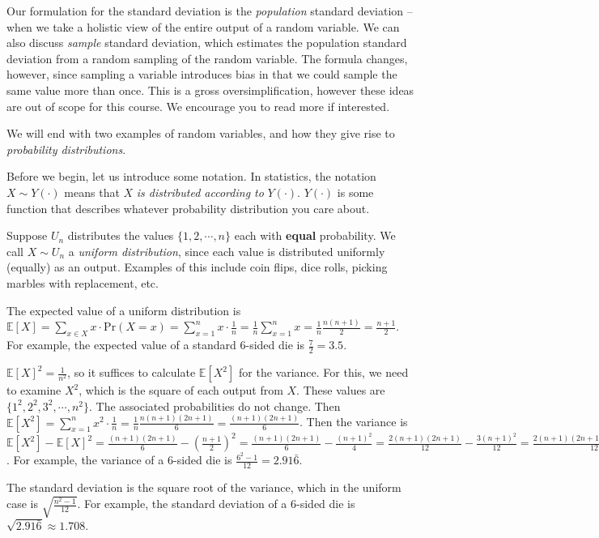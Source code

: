 \documentclass[main.tex]{subfiles}
\begin{document}
Our formulation for the standard deviation is the \textit{population} standard deviation -- when we take a holistic view of the entire output of a random variable. We can also discuss \textit{sample} standard deviation, which estimates the population standard deviation from a random sampling of the random variable. The formula changes, however, since sampling a variable introduces bias in that we could sample the same value more than once. This is a gross oversimplification, however these ideas are out of scope for this course. We encourage you to read more if interested.

We will end with two examples of random variables, and how they give rise to \textit{probability distributions}.

\begin{rem}
	Before we begin, let us introduce some notation. In statistics, the notation \(X \sim Y(\cdot)\) means that \(X\) \textit{is distributed according to} \(Y(\cdot)\). \(Y(\cdot)\) is some function that describes whatever probability distribution you care about.
\end{rem}

\begin{example}
	Suppose \(U_n\) distributes the values \(\{1,2,\cdots,n\}\) each with \textbf{equal} probability. We call \(X \sim U_n\) a \textit{uniform distribution}, since each value is distributed uniformly (equally) as an output. Examples of this include coin flips, dice rolls, picking marbles with replacement, etc.
	
	The expected value of a uniform distribution is \(\mathbb{E}[X] = \sum_{x \in X} x \cdot \mathrm{Pr}(X = x) = \sum_{x=1}^{n} x \cdot \frac{1}{n} = \frac{1}{n}\sum_{x=1}^{n}x = \frac{1}{n}\frac{n(n+1)}{2} = \frac{n+1}{2}\). For example, the expected value of a standard 6-sided die is \(\frac{7}{2} = 3.5\).
	
	\(\mathbb{E}[X]^2 = \frac{1}{n^2}\), so it suffices to calculate \(\mathbb{E}[X^2]\) for the variance. For this, we need to examine \(X^2\), which is the square of each output from \(X\). These values are \(\{1^2,2^2,3^2,\cdots,n^2\}\). The associated probabilities do not change. Then \(\mathbb{E}[X^2] = \sum_{x=1}^{n} x^2 \cdot \frac{1}{n} = \frac{1}{n} \frac{n(n+1)(2n+1)}{6} = \frac{(n+1)(2n+1)}{6}\). Then the variance is
	\(\mathbb{E}[X^2] - \mathbb{E}[X]^2
	= \frac{(n+1)(2n+1)}{6} - (\frac{n+1}{2})^2
	= \frac{(n+1)(2n+1)}{6} - \frac{(n+1)^2}{4}
	= \frac{2(n+1)(2n+1)}{12} - \frac{3(n+1)^2}{12}
	= \frac{2(n+1)(2n+1) - 3(n+1)^2}{12}
	= \frac{(2(2n+1) - 3(n+1))(n+1)}{12}
	= \frac{(n-1)(n+1)}{12}
	= \frac{n^2-1}{12}\).
	For example, the variance of a 6-sided die is \(\frac{6^2-1}{12} = 2.91\bar{6}\).
	
	The standard deviation is the square root of the variance, which in the uniform case is \(\sqrt{\frac{n^2-1}{12}}\). For example, the standard deviation of a 6-sided die is \(\sqrt{2.91\bar{6}} \approx 1.708\).
\end{example}
\end{document}
